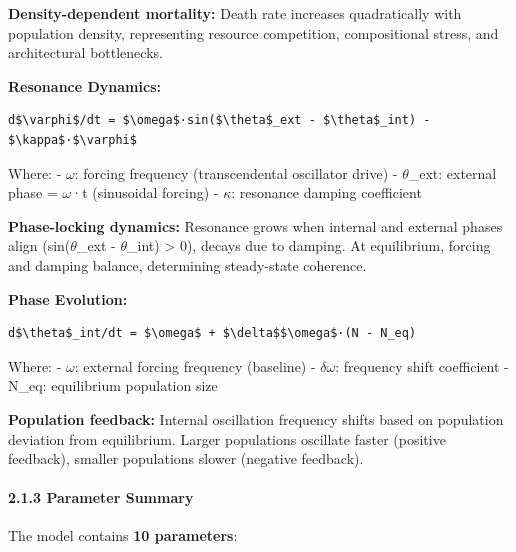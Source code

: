 \documentclass[
]{article}
\begin{document}
\textbf{Density-dependent mortality:} Death rate increases quadratically
with population density, representing resource competition,
compositional stress, and architectural bottlenecks.

\textbf{Resonance Dynamics:}

\begin{verbatim}
d$\varphi$/dt = $\omega$·sin($\theta$_ext - $\theta$_int) - $\kappa$·$\varphi$
\end{verbatim}

Where: - $\omega$: forcing frequency (transcendental oscillator drive) -
$\theta$\_ext: external phase = $\omega$·t (sinusoidal forcing) - $\kappa$: resonance damping
coefficient

\textbf{Phase-locking dynamics:} Resonance grows when internal and
external phases align (sin($\theta$\_ext - $\theta$\_int) \textgreater{} 0), decays
due to damping. At equilibrium, forcing and damping balance, determining
steady-state coherence.

\textbf{Phase Evolution:}

\begin{verbatim}
d$\theta$_int/dt = $\omega$ + $\delta$$\omega$·(N - N_eq)
\end{verbatim}

Where: - $\omega$: external forcing frequency (baseline) - $\delta$$\omega$: frequency shift
coefficient - N\_eq: equilibrium population size

\textbf{Population feedback:} Internal oscillation frequency shifts
based on population deviation from equilibrium. Larger populations
oscillate faster (positive feedback), smaller populations slower
(negative feedback).

\paragraph{2.1.3 Parameter Summary}\label{parameter-summary}

The model contains \textbf{10 parameters}:
\end{document}
